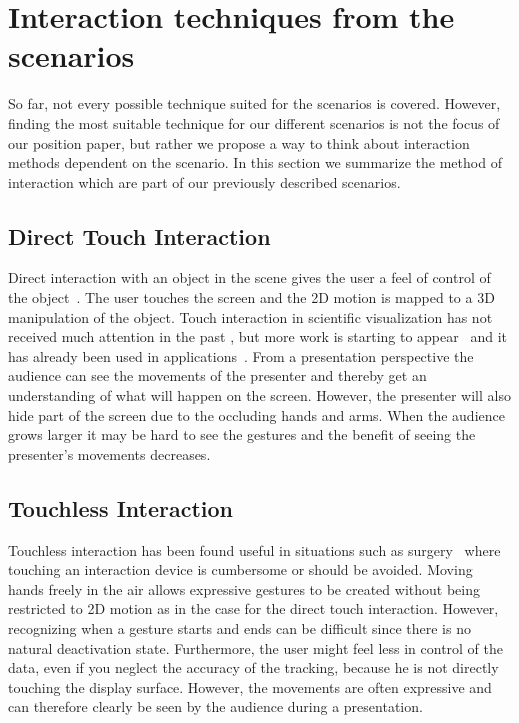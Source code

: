 \documentclass[review,journal]{vgtc}         %
\begin{document}
\section{Interaction techniques from the scenarios}

So far, not every possible technique suited for the scenarios is covered. However, finding the most suitable technique for our different scenarios is not the focus of our position paper, but rather we propose a way to think about interaction methods dependent on the scenario. In this section we summarize the method of interaction which are part of our previously described scenarios.

\subsection{Direct Touch Interaction}
Direct interaction with an object in the scene gives the user a feel of control of the object~\cite{isenberg2009studying}. 
The user touches the screen and the 2D motion is mapped to a 3D manipulation of the object. 
Touch interaction in scientific visualization has not received much attention in the past \cite{isenberg:hal-00781512}, 
but more work is starting to appear~\cite{Klein:2012:DSD:2322389.2322403} and it has already been used in applications~\cite{LRFPY11}.
From a presentation perspective the audience can see the movements of the presenter and thereby get an understanding of what will happen on the screen.
However, the presenter will also hide part of the screen due to the occluding hands and arms. 
When the audience grows larger it may be hard to see the gestures and the benefit of seeing the presenter's movements decreases.


\subsection{Touchless Interaction}
Touchless interaction has been found useful in situations such as surgery~\cite{Mentis:2012:IPI:2207676.2208536} where touching an interaction device is cumbersome or should be avoided.
Moving hands freely in the air allows expressive gestures to be created without being restricted to 2D motion as in the case for the direct touch interaction. However, recognizing when a gesture starts and ends can be difficult since there is no natural deactivation state. Furthermore, the user might feel less in control of the data, even if you neglect the accuracy of the tracking, because he is not directly touching the display surface. However, the movements are often expressive and can therefore clearly be seen by the audience during a presentation. 
\end{document}
